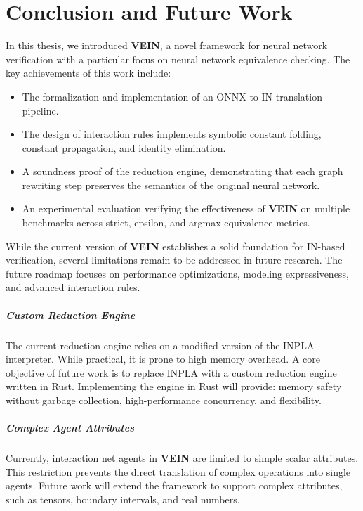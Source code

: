 \chapter{Conclusion and Future Work}
\label{ch:conclusion}

In this thesis, we introduced \textbf{VEIN}, a novel framework for neural network verification with
a particular focus on neural network equivalence checking. The key achievements of this work
include:
\begin{itemize}
	\item The formalization and implementation of an ONNX-to-IN translation pipeline.
	\item The design of interaction rules implements symbolic constant folding, constant
		propagation, and identity elimination.
	\item A soundness proof of the reduction engine, demonstrating that each graph rewriting step
		preserves the semantics of the original neural network.
	\item An experimental evaluation verifying the effectiveness of \textbf{VEIN} on multiple benchmarks
		across strict, epsilon, and argmax equivalence metrics.
\end{itemize}

While the current version of \textbf{VEIN} establishes a solid foundation for IN-based verification, several
limitations remain to be addressed in future research. The future roadmap focuses on performance
optimizations, modeling expressiveness, and advanced interaction rules.

\paragraph{Custom Reduction Engine}
The current reduction engine relies on a modified version of the INPLA interpreter. While
practical, it is prone to high memory overhead. A core objective of future work is to replace
INPLA with a custom reduction engine written in Rust. Implementing the engine in Rust will provide:
memory safety without garbage collection, high-performance concurrency, and flexibility.

\paragraph{Complex Agent Attributes}
Currently, interaction net agents in \textbf{VEIN} are limited to simple scalar attributes. This restriction
prevents the direct translation of complex operations into single agents. Future work will extend
the framework to support complex attributes, such as tensors, boundary intervals, and real numbers.

